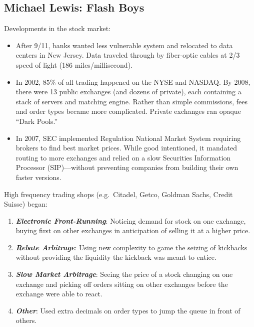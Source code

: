 \documentclass[
]{article}
\begin{document}
\hypertarget{michael-lewis-flash-boys}{%
\subsection{Michael Lewis: Flash Boys}\label{michael-lewis-flash-boys}}

Developments in the stock market:

\begin{itemize}
\item
  After 9/11, banks wanted less vulnerable system and relocated to data
  centers in New Jersey. Data traveled through by fiber-optic cables at
  2/3 speed of light (186 miles/millisecond).
\item
  In 2002, 85\% of all trading happened on the NYSE and NASDAQ. By 2008,
  there were 13 public exchanges (and dozens of private), each
  containing a stack of servers and matching engine. Rather than simple
  commissions, fees and order types became more complicated. Private
  exchanges ran opaque ``Dark Pools.''
\item
  In 2007, SEC implemented Regulation National Market System requiring
  brokers to find best market prices. While good intentioned, it
  mandated routing to more exchanges and relied on a slow Securities
  Information Processor (SIP)---without preventing companies from
  building their own faster versions.
\end{itemize}

High frequency trading shops (e.g.~Citadel, Getco, Goldman Sachs, Credit
Suisse) began:

\begin{enumerate}
\def\labelenumi{\arabic{enumi}.}
\item
  \textbf{\emph{Electronic Front-Running}}: Noticing demand for stock on
  one exchange, buying first on other exchanges in anticipation of
  selling it at a higher price.
\item
  \textbf{\emph{Rebate Arbitrage}}: Using new complexity to game the
  seizing of kickbacks without providing the liquidity the kickback was
  meant to entice.
\item
  \textbf{\emph{Slow Market Arbitrage}}: Seeing the price of a stock
  changing on one exchange and picking off orders sitting on other
  exchanges before the exchange were able to react.
\item
  \textbf{\emph{Other}}: Used extra decimals on order types to jump the
  queue in front of others.
\end{enumerate}
\end{document}
